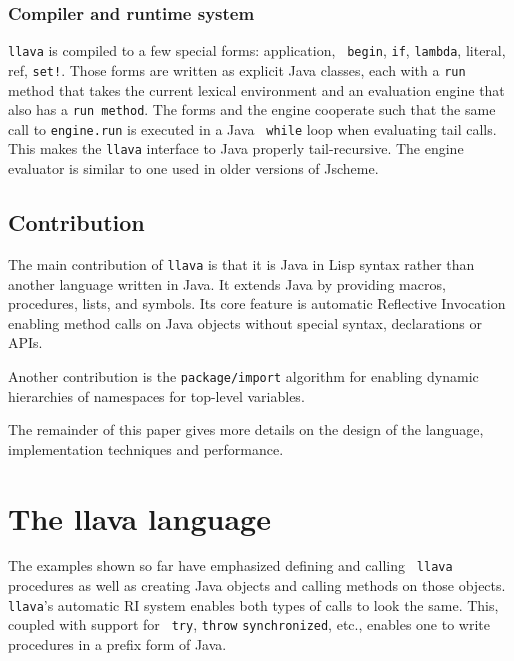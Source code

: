 \documentclass{acm-final/sig-alternate-modified}
\begin{document}
\subsubsection{Compiler and runtime system}

{\tt llava} is compiled to a few special forms: application, {\tt
begin}, {\tt if}, {\tt lambda}, literal, ref, {\tt set!}.  Those forms
are written as explicit Java classes, each with a {\tt run} method
that takes the current lexical environment and an evaluation engine
that also has a {\tt run method}.  The forms and the engine cooperate
such that the same call to {\tt engine.run} is executed in a Java {\tt
while} loop when evaluating tail calls.  This makes the {\tt llava}
interface to Java properly tail-recursive.  The engine evaluator is
similar to one used in older versions of Jscheme.

\subsection{Contribution}

The main contribution of {\tt llava} is that it is Java in Lisp syntax
rather than another language written in Java.  It extends Java by
providing macros, procedures, lists, and symbols.  Its core feature is
automatic Reflective Invocation enabling method calls on Java objects
without special syntax, declarations or APIs.

Another contribution is the {\tt package/import} algorithm for
enabling dynamic hierarchies of namespaces for top-level variables.

The remainder of this paper gives more details on the design of the
language, implementation techniques and performance.

\section{The llava language}

The examples shown so far have emphasized defining and calling {\tt
llava} procedures as well as creating Java objects and calling methods
on those objects.  {\tt llava}'s automatic RI system enables both
types of calls to look the same.  This, coupled with support for {\tt
try}, {\tt throw} {\tt synchronized}, etc., enables one to write
procedures in a prefix form of Java.
\end{document}
